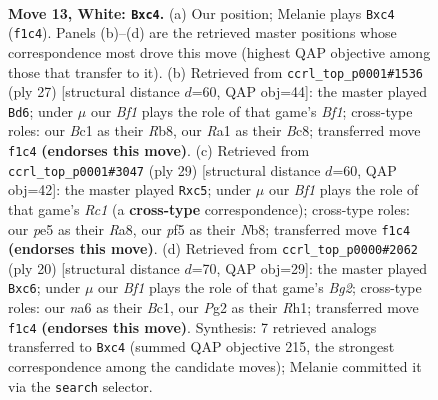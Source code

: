 \documentclass[11pt]{article}
\begin{document}
\clearpage

\begin{figure}[p]\centering
\begin{subfigure}{0.46\textwidth}\centering
\resizebox{\linewidth}{!}{%
\newchessgame
\chessboard[
  setfen={r3kbnr/p1P3p1/n5bp/4pp2/2p4P/6NR/PP3PP1/R1BK1BN1 w kq - 1 13},
  showmover=false,
  pgfstyle=straightmove, color=movearrow, markmove={f1-c4}
]}
\caption{}
\end{subfigure}\hfill
\begin{subfigure}{0.46\textwidth}\centering
\resizebox{\linewidth}{!}{%
\newchessgame
\chessboard[
  setfen={1rb1kb1r/5pp1/p1p1pn1p/B3p2P/N7/P7/1PP2PP1/R3KB1R b KQ - 0 14},
  showmover=false,
  pgfstyle=straightmove, color=movearrow, markmove={f8-d6}
]}
\caption{}
\end{subfigure}
\\[4pt]
\begin{subfigure}{0.46\textwidth}\centering
\resizebox{\linewidth}{!}{%
\newchessgame
\chessboard[
  setfen={rnr2k2/pp1bpp1p/5bp1/2P5/2BN1B2/4P3/PP3PPP/2R1K2R b K - 1 15},
  showmover=false,
  pgfstyle=straightmove, color=movearrow, markmove={c8-c5}
]}
\caption{}
\end{subfigure}\hfill
\begin{subfigure}{0.46\textwidth}\centering
\resizebox{\linewidth}{!}{%
\newchessgame
\chessboard[
  setfen={r1bk3r/p3bppp/2p1pn2/4p3/8/2N3P1/PPP2PBP/R1B1K2R w KQ - 0 11},
  showmover=false,
  pgfstyle=straightmove, color=movearrow, markmove={g2-c6}
]}
\caption{}
\end{subfigure}
\caption{\textbf{Move 13, White: \texttt{Bxc4}.} (a) Our position; Melanie plays \texttt{Bxc4} (\texttt{f1c4}). Panels (b)--(d) are the retrieved master positions whose correspondence most drove this move (highest QAP objective among those that transfer to it). (b) Retrieved from \texttt{ccrl\_top\_p0001\#1536} (ply 27) [structural distance $d$=60, QAP obj=44]: the master played \texttt{Bd6}; under $\mu$ our \emph{Bf1} plays the role of that game's \emph{Bf1}; cross-type roles: our \emph{B}c1 as their \emph{R}b8, our \emph{R}a1 as their \emph{B}c8; transferred move \texttt{f1c4} \textbf{(endorses this move)}. (c) Retrieved from \texttt{ccrl\_top\_p0001\#3047} (ply 29) [structural distance $d$=60, QAP obj=42]: the master played \texttt{Rxc5}; under $\mu$ our \emph{Bf1} plays the role of that game's \emph{Rc1} (a \textbf{cross-type} correspondence); cross-type roles: our \emph{p}e5 as their \emph{R}a8, our \emph{p}f5 as their \emph{N}b8; transferred move \texttt{f1c4} \textbf{(endorses this move)}. (d) Retrieved from \texttt{ccrl\_top\_p0000\#2062} (ply 20) [structural distance $d$=70, QAP obj=29]: the master played \texttt{Bxc6}; under $\mu$ our \emph{Bf1} plays the role of that game's \emph{Bg2}; cross-type roles: our \emph{n}a6 as their \emph{B}c1, our \emph{P}g2 as their \emph{R}h1; transferred move \texttt{f1c4} \textbf{(endorses this move)}. Synthesis: 7 retrieved analogs transferred to \texttt{Bxc4} (summed QAP objective 215, the strongest correspondence among the candidate moves); Melanie committed it via the \texttt{search} selector.}
\label{fig:thought-m24}
\end{figure}
\end{document}
